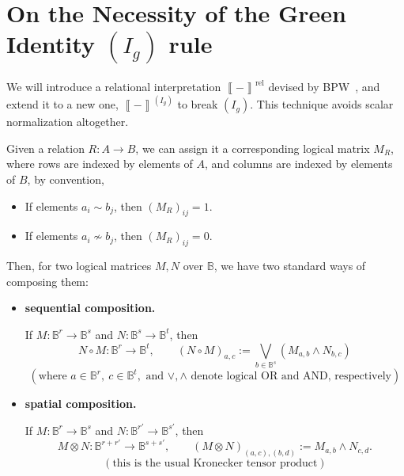 \documentclass[copyright,creativecommons]{eptcs}
\newcommand{\sem}[1]{\left\llbracket #1 \right\rrbracket}
\newcommand{\bool}{\mathbb{B}}
\theoremstyle{definition}
\theoremstyle{remark}
\begin{document}
\section{On the Necessity of the Green Identity \texorpdfstring{\((I_g)\)}{(Ig)} rule}
\label{sec:necessity-green-identity-ig-rule}

We will introduce a relational interpretation
\(\sem{-}^{\mathrm{rel}}\) devised by BPW~\cite{Backens_2020}, and extend it
to a new one, \(\sem{-}^{(I_g)}\) to break \((I_g)\).
This technique avoids scalar normalization altogether.

\bigskip

Given a relation \(R:A\to B\), we can
assign it a corresponding logical matrix \(M_R\),
where rows are indexed by elements of \(A\),
and columns are indexed by elements of \(B\), by
convention,
\begin{itemize}
    \item If elements \(a_i\sim b_j\), then \((M_R)_{ij}=1\).
    \item If elements \(a_i\nsim b_j\), then \((M_R)_{ij}=0\).
\end{itemize}

Then, for two logical matrices \(M,N\) over \(\bool\), we have two standard ways of composing them:
\begin{itemize}
\item \textbf{sequential composition.}

If \(M:\bool^r\to\bool^s\) and \(N:\bool^s\to\bool^t\), then
\[
N\circ M:\bool^r\to\bool^t,
\qquad
(N\circ M)_{a,c}:=\bigvee_{b\in \bool^s}(M_{a,b}\wedge N_{b,c})
\]
\[
(\text{where }a\in\bool^r,\ c\in\bool^t,\text{ and }\vee,\wedge\text{ denote logical OR and AND, respectively})
\]

\item \textbf{spatial composition.}

If \(M:\bool^r\to\bool^s\) and \(N:\bool^{r'}\to\bool^{s'}\), then
\[
M\otimes N:\bool^{r+r'}\to\bool^{s+s'},
\qquad
(M\otimes N)_{(a,c),(b,d)}:=M_{a,b}\wedge N_{c,d}.
\]
\[
(\text{this is the usual Kronecker tensor product})
\]
\end{itemize}
\end{document}
